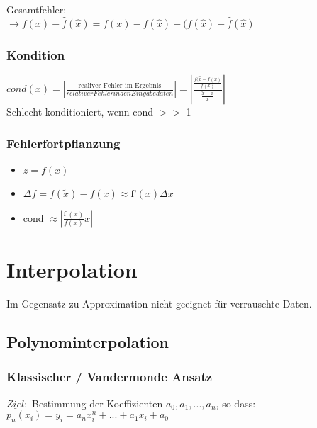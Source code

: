\documentclass[10pt,landscape,a4paper]{article}
\begin{document}
\begin{multicols}{3}
Gesamtfehler: \\
$\rightarrow f(x) - \hat{f}(\hat{x}) = f(x) - f(\hat{x}) + (f(\hat{x}) - \hat{f}(\hat{x})$

\subsubsection{Kondition}
$cond(x) = |\frac{\text{realiver Fehler im Ergebnis}}{relativer Fehler in den Eingabedaten}| = |\frac{\frac{f(\hat{x}-f(x)}{f(x)}}{\frac{\widetilde{x}-x}{x}}|$ \\
Schlecht konditioniert, wenn cond $>>$ 1

\subsubsection{Fehlerfortpflanzung}
\begin{itemize}
	\item $z = f(x)$
	\item $\Delta f = f(\widetilde{x}) - f(x) \approx \text{f'}(x) \Delta x$
	\item cond $\approx |\frac{\text{f'}(x)}{f(x)}x|$
\end{itemize}


\section{Interpolation}
Im Gegensatz zu Approximation nicht geeignet für verrauschte Daten.

\subsection{Polynominterpolation}
\subsubsection{Klassischer / Vandermonde Ansatz}
$\underline{Ziel}:$ Bestimmung der Koeffizienten $a_0, a_1, ..., a_n$, so dass:
$p_n(x_i) = y_i = a_n x_i^n + ... + a_1 x_i + a_0$ \\


\end{multicols}
\end{document}
